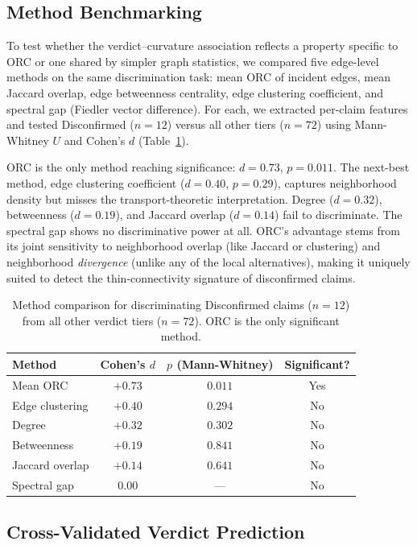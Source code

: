 \documentclass{article}
\begin{document}
\subsection{Method Benchmarking}
\label{sec:benchmarking}

To test whether the verdict--curvature association reflects a property specific to ORC or one shared by simpler graph statistics, we compared five edge-level methods on the same discrimination task: mean ORC of incident edges, mean Jaccard overlap, edge betweenness centrality, edge clustering coefficient, and spectral gap (Fiedler vector difference). For each, we extracted per-claim features and tested Disconfirmed ($n = 12$) versus all other tiers ($n = 72$) using Mann-Whitney $U$ and Cohen's $d$ (Table~\ref{tab:method}).

ORC is the only method reaching significance: $d = 0.73$, $p = 0.011$. The next-best method, edge clustering coefficient ($d = 0.40$, $p = 0.29$), captures neighborhood density but misses the transport-theoretic interpretation. Degree ($d = 0.32$), betweenness ($d = 0.19$), and Jaccard overlap ($d = 0.14$) fail to discriminate. The spectral gap shows no discriminative power at all. ORC's advantage stems from its joint sensitivity to neighborhood overlap (like Jaccard or clustering) and neighborhood \emph{divergence} (unlike any of the local alternatives), making it uniquely suited to detect the thin-connectivity signature of disconfirmed claims.

\begin{table}[t]
\centering
\caption{Method comparison for discriminating Disconfirmed claims ($n=12$) from all other verdict tiers ($n=72$). ORC is the only significant method.}
\label{tab:method}
\begin{tabular}{lccc}
\toprule
Method & Cohen's $d$ & $p$ (Mann-Whitney) & Significant? \\
\midrule
Mean ORC & $\mathbf{+0.73}$ & $\mathbf{0.011}$ & Yes \\
Edge clustering & $+0.40$ & $0.294$ & No \\
Degree & $+0.32$ & $0.302$ & No \\
Betweenness & $+0.19$ & $0.841$ & No \\
Jaccard overlap & $+0.14$ & $0.641$ & No \\
Spectral gap & $0.00$ & --- & No \\
\bottomrule
\end{tabular}
\end{table}

\subsection{Cross-Validated Verdict Prediction}
\label{sec:prediction}
\end{document}
